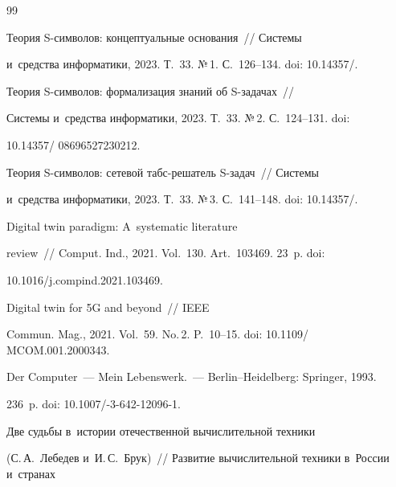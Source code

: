 {\small\frenchspacing


{%




\begin{thebibliography}{99}




   Теория S-сим\-во\-лов: концептуальные основания~/\!\!/ Сис\-те\-мы 


и~средства информатики, 2023. Т.~33. №\,1. С.~126--134. doi: 10.14357\!/.




   Теория S-символов: формализация знаний об S-за\-да\-чах~/\!\!/ 


Сис\-те\-мы и~средства информатики, 2023. Т.~33. №\,2. С.~124--131. doi: 


10.14357\!/ 08696527230212.




   Теория S-символов: сетевой табс-решатель S-задач~/\!\!/ Сис\-те\-мы 


и~средства информатики, 2023. Т.~33. №\,3. С.~141--148. doi: 10.14357\!/.




   Digital twin paradigm: A~systematic literature 


review~/\!\!/ Comput. Ind., 2021. Vol.~130. Art.~103469. 23~p. doi: 


10.1016\!/\!j.compind.2021.103469.




   Digital twin for 5G and beyond~/\!\!/ IEEE 


Commun. Mag., 2021. Vol.~59. No.\,2. P.~10--15. doi: 10.1109\!/ MCOM.001.2000343. 




   Der Computer~--- Mein Lebenswerk.~--- Berlin--Heidelberg: Springer, 1993. 


236~p. doi: 10.1007\!/-3-642-12096-1.




   Две судьбы в~истории отечественной вы\-чис\-ли\-тель\-ной техники 


(С.\,А.~Лебедев и~И.\,С.~Брук)~/\!\!/ Развитие вы\-чис\-ли\-тель\-ной техники в~России и~странах 



\end{thebibliography}}}
